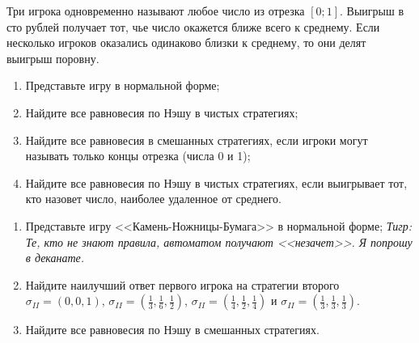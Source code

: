 \begin{problem}\par
\begin{source} \cite{cramton:lectures} \end{source}
Три игрока одновременно называют любое число из отрезка  $\left[0;1\right]$. Выигрыш в сто рублей получает тот, чье число окажется ближе всего к среднему. Если несколько игроков оказались одинаково близки к среднему, то они делят выигрыш поровну.\par
\begin{enumerate}
\item 	Представьте игру в нормальной форме;\par
\item 	Найдите все равновесия по Нэшу в чистых стратегиях;\par
\item 	Найдите все равновесия в смешанных стратегиях, если игроки могут называть только концы отрезка (числа 0 и 1);\par
\item	        Найдите все равновесия по Нэшу в чистых стратегиях, если выигрывает тот, кто назовет число, наиболее удаленное от среднего.
\end{enumerate}


\begin{sol}

\end{sol}
\end{problem}



\begin{problem}
\begin{enumerate}
\item 	Представьте игру <<Камень-Ножницы-Бумага>> в нормальной форме; {\it Тигр: Те, кто не знают правила, автоматом получают <<незачет>>. Я попрошу в деканате.}\par
\item 	Найдите наилучший ответ первого игрока на стратегии второго  $\sigma _{II} =\left(0,0,1\right)$,  $\sigma _{II} =\left(\frac{1}{3},\frac{1}{6},\frac{1}{2} \right)$,  $\sigma _{II} =\left(\frac{1}{4},\frac{1}{2},\frac{1}{4} \right)$  и  $\sigma _{II} =\left(\frac{1}{3},\frac{1}{3},\frac{1}{3} \right)$.\par
\item 	Найдите все равновесия по Нэшу в смешанных стратегиях.
\end{enumerate}

\begin{sol}

\end{sol}
\end{problem}



